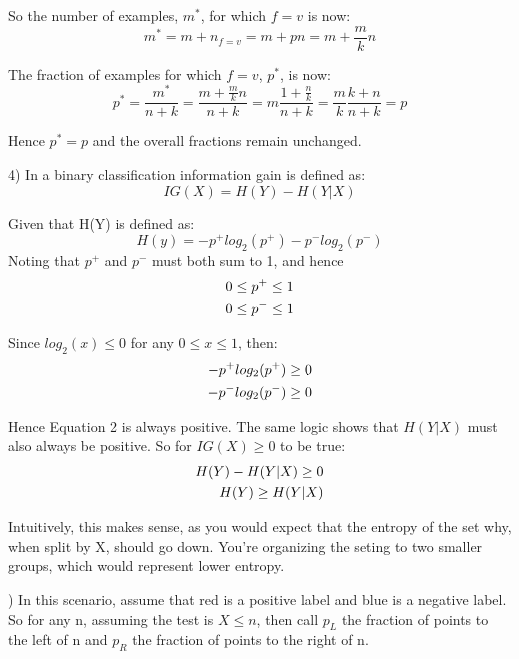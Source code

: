 \documentclass[12pt]{article}
\begin{document}
So the number of examples, $m^*$, for which $f=v$ is now: 
\begin{equation}
    m^* = m + n_{f=v} = m+pn = m+\frac{m}{k}n
\end{equation}

The fraction of examples for which $f=v$, $p^*$, is now: 
\begin{equation}
    p^* = \frac{m^*}{n+k} = \frac{m+\frac{m}{k}n}{n+k} = m\frac{1+\frac{n}{k}}{n+k}
    = \frac{m}{k}\frac{k+n}{n+k} = p
\end{equation}

Hence $p^*=p$ and the overall fractions remain unchanged.

\pagebreak
\setcounter{equation}{0}
4) In a binary classification information gain is defined as: 
\begin{equation}
    IG(X) = H(Y) - H(Y|X)
\end{equation}

Given that H(Y) is defined as: 
\begin{equation}
    H(y)= -p^+log_2(p^+)-p^-log_2(p^-)
\end{equation}
Noting that $p^+$ and $p^-$ must both sum to 1, and hence
\begin{align}
    0 & \leq p^+ \leq 1 \notag \\  
    0 & \leq p^- \leq 1 
\end{align}

Since $log_2(x) \leq 0 $ for any $0\leq x \leq 1$, then: 
\begin{align}
    -p^+log_2(p^+) \geq 0 \notag \\  
    -p^-log_2(p^-) \geq 0
\end{align}

Hence Equation 2 is always positive. The same logic shows that $H(Y|X)$
must also always be positive. So for $IG(X) \geq 0$ to be true: 
\begin{align}
    H(Y) - H(Y|X) \geq 0 \notag \\
    H(Y) \geq H(Y|X)
\end{align}

Intuitively, this makes sense, as you would expect that the entropy of the set 
why, when split by X, should go down. You're organizing the seting to two smaller
groups, which would represent lower entropy. 

) In this scenario, assume that red is a positive label and blue is a negative label. 
So for any n, assuming the test is $X\leq n$, then call $p_{L}$ the fraction of points
to the left of n and $p_{R}$ the fraction of points to the right of n. 
\end{document}
